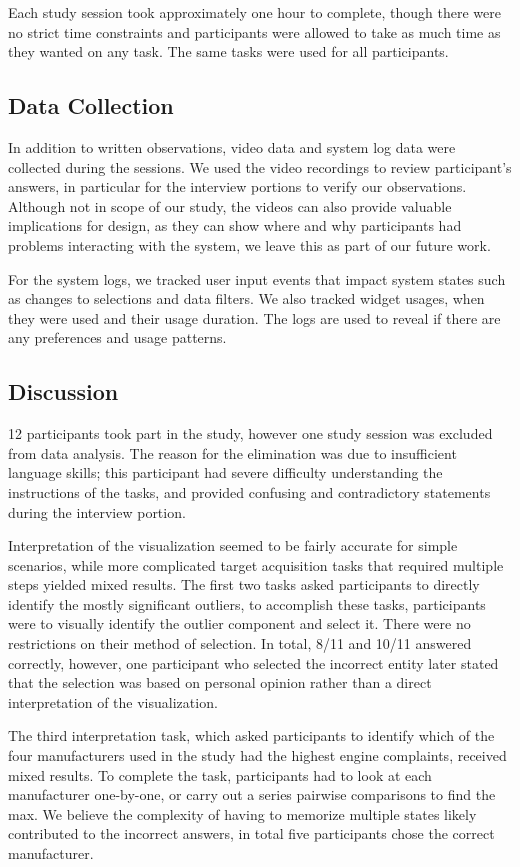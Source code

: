 Each study session took approximately one hour to complete, though there were no
strict time constraints and participants were allowed to take as much time as
they wanted on any task. The same tasks were used for all
participants. 


\subsection{Data Collection}
In addition to written observations, video data and system log data were 
collected during the sessions. We used the video recordings to review 
participant's answers, in particular for the interview portions to verify 
our observations. Although not in scope of our study, the videos can also provide 
valuable implications for design, as they can show where and why participants had 
problems interacting with the system, we leave this as part of our future work. 

For the system logs, we tracked user input events that impact system states such
as changes to selections and data filters. We also tracked widget usages, when they were used and
their usage duration. The logs are used to reveal if there are any preferences and usage 
patterns.
 

\subsection{Discussion}
12 participants took part in the study, however one study session was excluded
from data analysis. The reason for the elimination was due to insufficient language skills; 
this participant had severe difficulty understanding the instructions of the tasks, 
and provided confusing and contradictory statements during the interview portion.

Interpretation of the \threed visualization seemed to be fairly accurate for
simple scenarios, while more complicated target acquisition tasks that required
multiple steps yielded mixed results. The first two tasks asked
participants to directly identify the mostly significant outliers, to accomplish
these tasks, participants were to visually identify the outlier \threed
component and select it. There were no restrictions on their method of
selection. In total, 8/11 and 10/11 answered correctly, however, one participant
who selected the incorrect entity later stated that the selection was based on
personal opinion rather than a direct interpretation of the visualization.

The third interpretation task, which asked participants to identify which of the four
manufacturers used in the study had the highest engine complaints, received
mixed results. To complete the task, participants had to look at each
manufacturer one-by-one, or carry out a series pairwise comparisons to find the
max. We believe the complexity of having to memorize multiple states likely
contributed to the incorrect answers, in total five participants chose the correct
manufacturer. 

